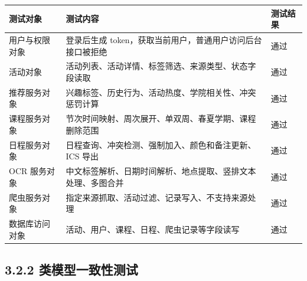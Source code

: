 {\def\LTcaptype{none} %
\begin{longtable}[]{@{}|
  >{\raggedright\arraybackslash}p{}|
  >{\raggedright\arraybackslash}p{}|
  >{\raggedright\arraybackslash}p{}|@{}}
\hline
\rowcolor{gray!12}
\begin{minipage}[b]{\linewidth}\raggedright
\bfseries 测试对象
\end{minipage} & \begin{minipage}[b]{\linewidth}\raggedright
\bfseries 测试内容
\end{minipage} & \begin{minipage}[b]{\linewidth}\raggedright
\bfseries 测试结果
\end{minipage} \\
\hline
\endhead
\hline
\endlastfoot
用户与权限对象 & 登录后生成
token，获取当前用户，普通用户访问后台接口被拒绝 & 通过 \\
\hline
活动对象 & 活动列表、活动详情、标签筛选、来源类型、状态字段读取 &
通过 \\
\hline
推荐服务对象 & 兴趣标签、历史行为、活动热度、学院相关性、冲突惩罚计算 &
通过 \\
\hline
课程服务对象 & 节次时间映射、周次展开、单双周、春夏学期、课程删除范围 &
通过 \\
\hline
日程服务对象 & 日程查询、冲突检测、强制加入、颜色和备注更新、ICS 导出 &
通过 \\
\hline
OCR 服务对象 &
中文标签解析、日期时间解析、地点提取、竖排文本处理、多图合并 & 通过 \\
\hline
爬虫服务对象 & 指定来源抓取、活动过滤、记录写入、不支持来源处理 &
通过 \\
\hline
数据库访问对象 & 活动、用户、课程、日程、爬虫记录等字段读写 & 通过 \\
\hline
\end{longtable}
}

\subsection{3.2.2
类模型一致性测试}\label{ux7c7bux6a21ux578bux4e00ux81f4ux6027ux6d4bux8bd5}

